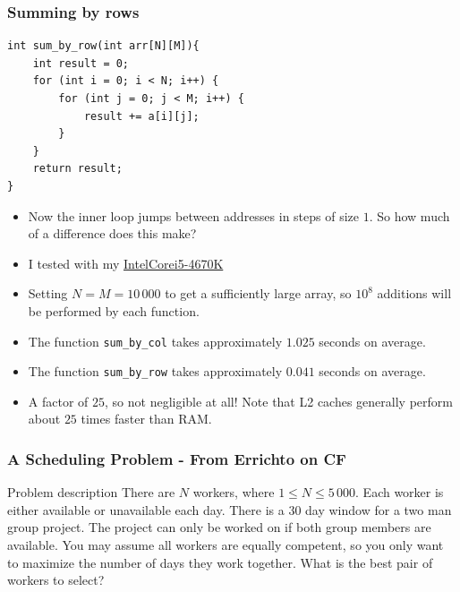 \documentclass[11pt]{beamer}
\begin{document}
\begin{frame}
    \frametitle{Summing by rows}
    \begin{scriptsize}
        \begin{verbatim}
int sum_by_row(int arr[N][M]){
    int result = 0;
    for (int i = 0; i < N; i++) {
        for (int j = 0; j < M; i++) {
            result += a[i][j];
        }
    }
    return result;
}
        \end{verbatim}
    \end{scriptsize}
    \begin{itemize}
        \item<2-> Now the inner loop jumps between addresses in steps of size $1$. So how much of a difference does this make?
        \item<3-> I tested with my \href{https://www.intel.com/content/www/us/en/products/sku/75048/intel-core-i54670k-processor-6m-cache-up-to-3-80-ghz/specifications.html}{Intel\textregistered Core\texttrademark i5-4670K}
        \item<4-> Setting $N = M = 10\,000$ to get a sufficiently large array, so $10^8$ additions will be performed by each function.
        \item<5-> The function \texttt{sum\_by\_col} takes approximately $1.025$ seconds on average.
        \item<6-> The function \texttt{sum\_by\_row} takes approximately $0.041$ seconds on average.
        \item<7-> A factor of $25$, so not negligible at all! Note that L2 caches generally perform about $25$ times faster than RAM.
    \end{itemize}
\end{frame}

\begin{frame}[plain]
	\frametitle{A Scheduling Problem - From Errichto on CF}
	\begin{block}{Problem description}
        There are $N$ workers, where $1 \leq N \leq 5\,000$.
        Each worker is either available or unavailable each day.
        There is a $30$ day window for a two man group project.
        The project can only be worked on if both group members are available.
        You may assume all workers are equally competent, so you only want to maximize the number of days they work together.
        What is the best pair of workers to select?
    \end{block}
\end{frame}
\end{document}
